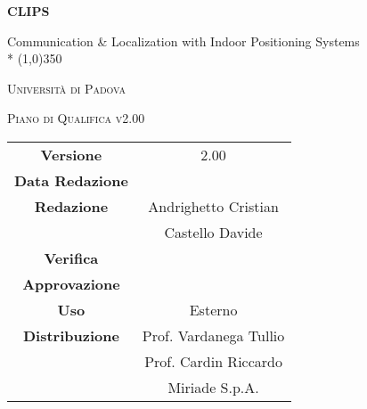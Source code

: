 \documentclass[a4paper,12pt]{article}
\author{Andrighetto Cristian, Castello Davide}
\date{27/12/2015}
\begin{document}
	\begin{titlepage}
		\centering
	{\huge\bfseries CLIPS\par}
	Communication \& Localization with Indoor Positioning Systems \\*
	\line(1,0){350} \\
	{\scshape\LARGE Università di Padova \par}
	\vspace{1cm}
	{\scshape\Large Piano di Qualifica v2.00 \par}
	\logo
	\newpage
		\begin{tabular}{c|c}
			{\hfill \textbf{Versione}} 			& 2.00 \\
			{\hfill\textbf{Data Redazione}} 		&   		\\ 
			{\hfill\textbf{Redazione}} 			&  Andrighetto Cristian \\ 
											& Castello Davide       \\
			{\hfill\textbf{Verifica}} 				&     \\
			{\hfill\textbf{Approvazione}} 		&  \\
			{\hfill\textbf{Uso}} 					& Esterno			\\
			{\hfill\textbf{Distribuzione}} 			& Prof. Vardanega Tullio \\
											& Prof. Cardin Riccardo \\
											& Miriade S.p.A.
		\end{tabular}
	\end{titlepage}
	
	\newpage
	\pagestyle{myfront}
		
	
	\newpage
		\tableofcontents
	
	\newpage
		\listoftables
	
	\label{LastFrontPage}
	\newpage
		\pagestyle{mymain}
	
\newpage
	
\newpage
	
\newpage
	
\newpage
	
\newpage
	
\newpage
	
\newpage
	
\newpage
	
\label{LastPage}
\end{document}
